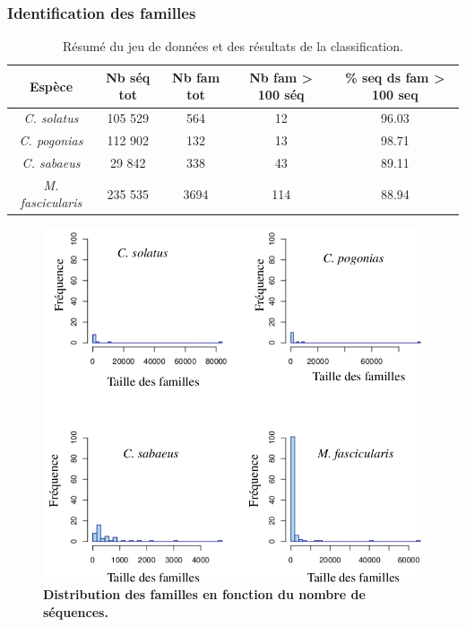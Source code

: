 \documentclass[12pt,a4paper]{article}
\begin{document}
			\subsubsection{Identification des familles}
	
				\begin{table}
			\caption{Résumé du jeu de données et des résultats de la classification.}
			\center
			\begin{tabular}{|c|c|c|c|c|}
   			\hline
  			\textbf{Espèce} & \textbf{Nb séq tot} & \textbf{Nb fam tot} & \textbf{Nb fam > 100 séq} & \textbf{\%  seq ds fam > 100 seq}\\
  		    \hline
   			\textit{C. solatus} & 105 529 & 564 & 12 & 96.03  \\
   			\hline
    		\textit{C. pogonias} & 112 902 & 132 & 13 & 98.71\\
   			\hline
   			\textit{C. sabaeus} & 29 842 & 338 & 43 & 89.11\\
   			\hline
   			\textit{M. fascicularis} & 235 535 & 3694 & 114 & 88.94\\
   			\hline			
			\end{tabular}
			
			\label{tab_res}
		\end{table}
		
		\begin{figure}
			\center
			\includegraphics[scale=0.45]{img/distribution_familles.png}
			\caption{\textbf{Distribution des familles en fonction du nombre de séquences.}}
			\label{dist_fam} 
		\end{figure}
\end{document}

